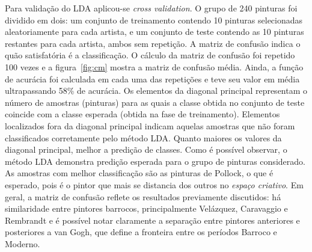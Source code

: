 Para validação do LDA aplicou-se \textit{cross validation}. O grupo de
240 pinturas foi dividido em dois: um conjunto de treinamento contendo
10 pinturas selecionadas aleatoriamente para cada artista, e um
conjunto de teste contendo as 10 pinturas restantes para cada artista,
ambos sem repetição. A matriz de confusão indica o quão satisfatória é
a classificação. O cálculo da matriz de confusão foi repetido 100
vezes e a figura~\ref{fig:cm} mostra a matriz de confusão
média. Ainda, a função de acurácia foi calculada em cada uma das
repetições e teve seu valor em média ultrapassando 58\% de
acurácia. Os elementos da diagonal principal representam o número de
amostras (pinturas) para as quais a classe obtida no conjunto de teste
coincide com a classe esperada (obtida na fase de
treinamento). Elementos localizados fora da diagonal principal indicam
aquelas amostras que não foram classificados corretamente pelo método
LDA. Quanto maiores os valores da diagonal principal, melhor a
predição de classes. Como é possível observar, o método LDA demonstra
predição esperada para o grupo de pinturas considerado. As amostras
com melhor classificação são as pinturas de Pollock, o que é esperado,
pois é o pintor que mais se distancia dos outros no \textit{espaço
  criativo}. Em geral, a matriz de confusão reflete os resultados
previamente discutidos: há similaridade entre pintores barrocos,
principalmente Velázquez, Caravaggio e Rembrandt e é possível notar
claramente a separação entre pintores anteriores e posteriores a van
Gogh, que define a fronteira entre os períodos Barroco e Moderno.

